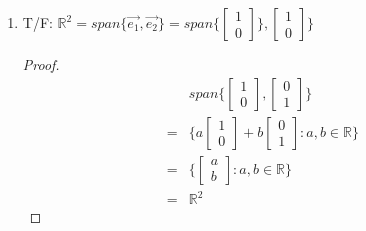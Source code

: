 \documentclass[11pt]{article}
\theoremstyle{plain}
\theoremstyle{remark}
\theoremstyle{plain}
\newcommand{\rn}{\mathbb{R}}
\begin{document}
\begin{tcolorbox}[colback=magenta!5!white,colframe=magenta!75!black,title=Problem 4]
   \begin{enumerate}
       \item T/F: $\rn^2=span\{\overrightarrow{e_1}, \overrightarrow{e_2}\}=span \{\begin{bmatrix}
           1\\0
       \end{bmatrix}\}, \begin{bmatrix}
           1\\0
       \end{bmatrix}\}$

       \begin{proof}
           \begin{align*}
               &span\{\begin{bmatrix}
                   1\\0
               \end{bmatrix}, \begin{bmatrix}
                   0\\1
               \end{bmatrix}\}\\
               =&\{a\begin{bmatrix}
                   1\\0
               \end{bmatrix}+b\begin{bmatrix}
                   0\\1
               \end{bmatrix}:a,b\in\rn\}\\
               =&\{\begin{bmatrix}
                   a\\b
               \end{bmatrix}:a,b\in\rn\}\\
               =&\rn^2
           \end{align*}
       \end{proof}


\end{enumerate}
\end{tcolorbox}
\end{document}
